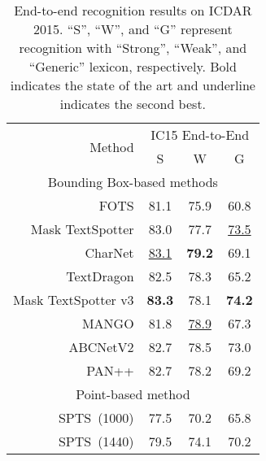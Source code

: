 \documentclass[sigconf]{acmart}
\newcommand{\methodName}{SPTS}
\begin{document}
\begin{table}[b!]
    \centering
    \caption{End-to-end recognition results on ICDAR 2015. “S”, “W”, and “G” represent recognition with “Strong”, “Weak”, and “Generic” lexicon, respectively. Bold indicates the state of the art and underline indicates the second best.}
    \label{ICDAR 2015 End-to-End recognition result v2}
    \small
    \begin{tabular}{r|c|c|c}
\hline
    \multirow{2}{*}{Method} & \multicolumn{3}{c}{IC15 End-to-End}                    \\ \cline{2-4} 
                            & \multicolumn{1}{c|}{S}    & \multicolumn{1}{c|}{W}    & G    \\ \hline
    \multicolumn{4}{c}{Bounding Box-based methods} \\ \hline                               
    FOTS \cite{liu2018fots}                    & \multicolumn{1}{c|}{81.1} & \multicolumn{1}{c|}{75.9} & 60.8 \\
    Mask TextSpotter \cite{liao2019mask}        & \multicolumn{1}{c|}{83.0} & \multicolumn{1}{c|}{77.7} & \underline{73.5} \\
    CharNet \cite{xing2019convolutional}                 & \underline{83.1} & \multicolumn{1}{c|}{\textbf{79.2}} & 69.1 \\
    TextDragon \cite{feng2019textdragon} & \multicolumn{1}{c|}{82.5} & \multicolumn{1}{c|}{78.3} & 65.2 \\
    Mask TextSpotter v3 \cite{liao2020masktext} & \multicolumn{1}{c|}{\textbf{83.3}} & \multicolumn{1}{c|}{78.1} & \textbf{74.2} \\
    MANGO \cite{qiao2021mango}                   & \multicolumn{1}{c|}{81.8} & \underline{78.9} & 67.3 \\
    ABCNetV2 \cite{liu2021abcnetv2}                & \multicolumn{1}{c|}{82.7} & \multicolumn{1}{c|}{78.5} & 73.0 \\ 
    PAN++ \cite{wang2021pan++}                   & \multicolumn{1}{c|}{82.7} & \multicolumn{1}{c|}{78.2} & 69.2 \\
    \hline
    \multicolumn{4}{c}{Point-based method} \\ \hline   
    \methodName\ (1000) &  77.5 & 70.2 & 65.8 \\
    \methodName\ (1440) &  79.5 & 74.1 & 70.2 \\ \hline
    \end{tabular}
\end{table}
\end{document}
